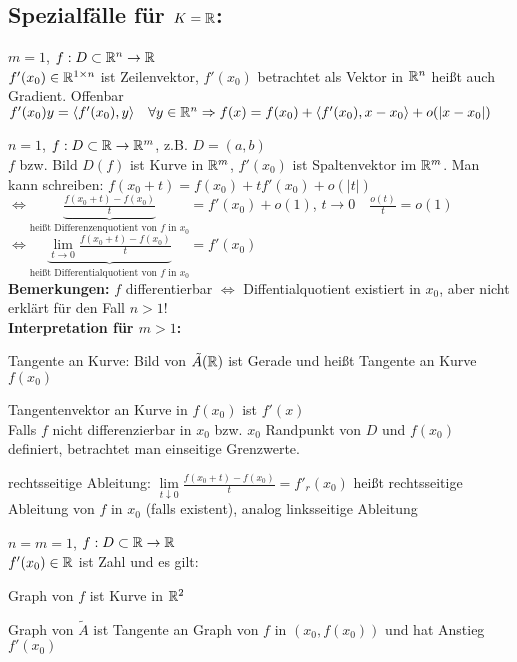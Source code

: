 \subsection{Spezialfälle für $K=\mathbb{R}$:}
	\begin{compactitem}
		\item $m=1$, $f:D\subset \mathbb{R}^n\to \mathbb{R}$ \\
		$f'(x_0)\in \mathbb{R}^{1\times n}$ ist Zeilenvektor, $f'(x_0)$ betrachtet als Vektor in $\mathbb{R}^n$ heißt auch 
		Gradient. Offenbar $f'(x_0)y=\langle f'(x_0),y\rangle \quad\forall y\in \mathbb{R}^n\Rightarrow f(x)=
		f(x_0)+\langle f'(x_0),x-x_0 \rangle + o(|x-x_0|)$
		\item $n=1$, $f:D\subset \mathbb{R}\to \mathbb{R}^m$, z.B. $D=(a,b)$ \\
		$f$ bzw. Bild $D(f)$ ist Kurve in $\mathbb{R}^m$, $f'(x_0)$ ist Spaltenvektor im $\mathbb{R}^m$. Man kann 
		schreiben: $f(x_0+t)=f(x_0)+tf'(x_0)+o(|t|)$ \\
		$\iff \underbrace{\frac{f(x_0+t)-f(x_0)}{t}}_{\text{heißt Differenzenquotient von
		 }f\text{ in }x_0}=f'(x_0)+o(1)$, $t\to 0\quad \frac{o(t)}{t}=o(1)$ \\
	 	$\iff \underbrace{\lim\limits_{t\to 0}\frac{f(x_0+t)-f(x_0)}{t}}_{\text{heißt Differentialquotient von
	 		}f\text{ in }x_0}=f'(x_0)$ \\
 		\textbf{Bemerkungen:} $f$ differentierbar $\iff$ Diffentialquotient existiert in $x_0$, aber nicht 
 		erklärt für den Fall $n>1$! \\
 		\textbf{Interpretation für $m>1$:} \begin{compactitem}
 			\item Tangente an Kurve: Bild von $\tilde A(\mathbb{R})$ ist Gerade und heißt Tangente an Kurve 
 			$f(x_0)$
 			\item Tangentenvektor an Kurve in $f(x_0)$ ist $f'(x)$ \\
 			Falls $f$ nicht differenzierbar in $x_0$ bzw. $x_0$ Randpunkt von $D$ und $f(x_0)$ 
 			definiert, betrachtet man einseitige Grenzwerte.
 			\item rechtsseitige Ableitung: $\lim\limits_{t\downarrow 0}\frac{f(x_0+t)-f(x_0)}{t}=f'_r(x_0)$ 
 			heißt rechtsseitige Ableitung von $f$ in $x_0$ (falls existent), analog linksseitige Ableitung
 		\end{compactitem}
 		\item $n=m=1$, $f:D\subset \mathbb{R}\to \mathbb{R}$ \\
 		$f'(x_0)\in \mathbb{R}$ ist Zahl und es gilt: \begin{compactitem}
 			\item Graph von $f$ ist Kurve in $\mathbb{R}^2$
 			\item Graph von $\tilde{A}$ ist Tangente an Graph von $f$ in $(x_0,f(x_0))$ und hat Anstieg 
 			$f'(x_0)$
 		\end{compactitem}
	\end{compactitem}

